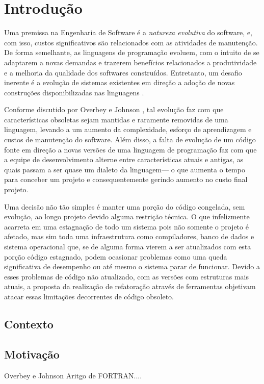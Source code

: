 \chapter{Introdução}

Uma premissa na Engenharia de Software é a \emph{natureza evolutiva} do software, e, com isso, 
custos significativos são relacionados com as atividades de manutenção. De forma semelhante, 
as linguagens de programação evoluem, com o intuito de se adaptarem a novas demandas e trazerem 
benefícios relacionados a produtividade e a melhoria da qualidade dos softwares construídos. Entretanto, um 
desafio inerente é a evolução de sistemas existentes em direção a adoção de novas construções 
disponibilizadas nas linguagens \cite{Dyer:2013}.

Conforme discutido por Overbey e Johnson \cite{Overbey:2009}, 
tal evolução faz com que características obsoletas sejam mantidas e raramente removidas de uma linguagem, 
levando a um aumento da complexidade, esfor\c co de aprendizagem e custos de manutenção do software. 
Além disso, a falta de evolução de um código fonte em direção a 
novas versões de uma linguagem de programação faz com que a equipe de 
desenvolvimento alterne entre características atuais e antigas, as quais passam a ser 
quase um dialeto da linguagem--- o que aumenta o tempo para conceber um projeto 
e consequentemente gerindo aumento no custo final projeto.

Uma decisão não tão simples é manter uma porção do código congelada, sem evolução, ao longo projeto devido alguma restrição técnica. O que infelizmente acarreta em uma estagnação de todo um sistema pois não somente o projeto \'{e} afetado, mas sim toda uma infraestrutura como compiladores, banco de dados e sistema operacional que, se de alguma forma vierem a ser atualizados com esta porção código estagnado, 
podem ocasionar problemas como uma queda significativa de desempenho ou até mesmo o sistema parar de funcionar. Devido a esses problemas de código não atualizado, com as versões com estruturas mais atuais, a proposta da realização de refatoração através de 
ferramentas objetivam atacar essas limita\c c\~{o}es decorrentes de código obsoleto.


\section{Contexto}

\section{Motivação}Overbey e Johnson
	Aritgo de FORTRAN....

